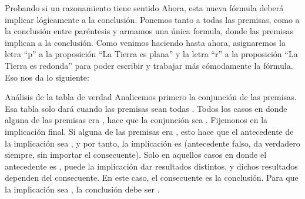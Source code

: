 
\begin{frame}{Probando si un razonamiento tiene sentido}
  Ahora, esta nueva fórmula deberá implicar lógicamente a la conclusión. Ponemos
  tanto a todas las premisas, como a la conclusión entre paréntesis y armamos una
  única formula, donde las premisas implican a la conclusión.
  \jump
  \jump
  Como venimos haciendo hasta ahora, asignaremos la letra ``p'' a la proposición
  ``La Tierra es plana'' y la letra ``r'' a la proposición ``La Tierra es redonda''
  para poder escribir y trabajar más cómodamente la fórmula.
  \jump
  Eso nos da lo siguiente:
\end{frame}




\begin{frame}{Análisis de la tabla de verdad}
  Analicemos primero la conjunción de las premisas.
  Esa tabla solo dará \fulltrue cuando las premisas sean todas \fulltrue.
  Todos los casos en donde alguna de las premisas era \fullfalse, hace que la
  conjunción sea \fullfalse.
  \jump
  Fijemonos en la implicación final. Si alguna de las premisas era \fullfalse,
  esto hace que el antecedente de la implicación sea \fullfalse, y por tanto,
  la implicación es \fulltrue (antecedente falso, da verdadero siempre, sin
  importar el consecuente).
  \jump
  Solo en aquellos casos en donde el antecedente es \fulltrue, puede la implicación
  dar resultados distintos, y dichos resultados dependen del consecuente. En este
  caso, el consecuente es la conclusión. Para que la implicación sea \fulltrue,
  la conclusión debe ser \fulltrue.
\end{frame}

